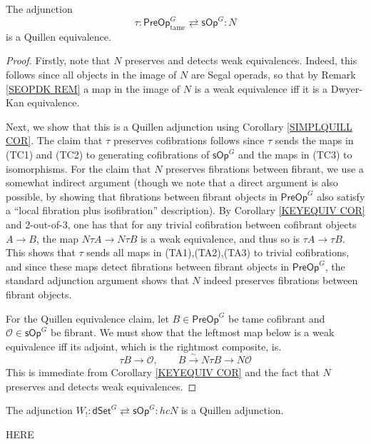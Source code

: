\documentclass[a4paper,10pt
,draft
]{article}%
\renewcommand{\1}{\eta}%
\begin{document}
\begin{proposition}\label{PREQUIEQUIV PROP}
The adjunction
\[
	\tau \colon \mathsf{PreOp}^G_{\text{tame}}
		\rightleftarrows 
	\mathsf{sOp}^G \colon N
\]
is a Quillen equivalence.
\end{proposition}


\begin{proof}
Firstly, note that $N$ preserves and detects weak equivalences.
Indeed, this follows since all objects in the image of $N$ are Segal operads, so that by Remark \ref{SEOPDK REM} a map in the image of $N$ is a weak equivalence iff it is a Dwyer-Kan equivalence.

Next, we show that this is a Quillen adjunction using Corollary \ref{SIMPLQUILL COR}.
The claim that $\tau$ preserves cofibrations follows since
$\tau$ sends the maps in (TC1) and (TC2) to generating cofibrations of $\mathsf{sOp}^G$ and the maps in (TC3) to isomorphisms.
For the claim that $N$ preserves fibrations between fibrant,
we use a somewhat indirect argument
(though we note that a direct argument is also possible,
by showing that fibrations between fibrant objects in $\mathsf{PreOp}^G$
also satisfy a ``local fibration plus isofibration'' description).
By Corollary \ref{KEYEQUIV COR} and 2-out-of-3, 
one has that for any trivial cofibration between cofibrant objects
$A \to B$, the map $N \tau A \to N \tau B$ is a weak equivalence, and thus so is $\tau A \to \tau B$.
This shows that $\tau$ sends all maps in (TA1),(TA2),(TA3)
to trivial cofibrations, and since these maps detect fibrations between fibrant objects in $\mathsf{PreOp}^G$, 
the standard adjunction argument shows that 
$N$ indeed preserves fibrations between fibrant objects.

For the Quillen equivalence claim, 
let $B \in \mathsf{PreOp}^G$ be tame cofibrant and
$\mathcal{O} \in \mathsf{sOp}^G$ be fibrant.
We must show that the leftmost map below is a weak equivalence iff its adjoint, which is the rightmost composite, is.
\[
	\tau B \to \mathcal{O},
\qquad
	B \xrightarrow{\sim} N \tau B \to N \mathcal{O}
\]
This is immediate from Corollary \ref{KEYEQUIV COR}
and the fact that $N$ preserves and detects weak equivalences.
\end{proof}


\begin{proposition}
	The adjunction 
$W_! \colon \mathsf{dSet}^G 
	\rightleftarrows 
\mathsf{sOp}^G \colon hcN$
	is a Quillen adjunction.
\end{proposition}

{\color{red} HERE}
\end{document}
